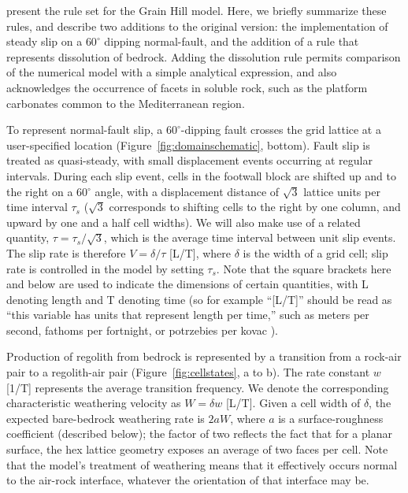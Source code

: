 \citet{tucker2018lattice} present the rule set for the Grain Hill model. Here, we briefly summarize these rules, and describe two additions to the original version: the implementation of steady slip on a $60^\circ$ dipping normal-fault, and the addition of a rule that represents dissolution of bedrock. Adding the dissolution rule permits comparison of the numerical model with a simple analytical expression, and also acknowledges the occurrence of facets in soluble rock, such as the platform carbonates common to the Mediterranean region.

To represent normal-fault slip, a $60^\circ$-dipping fault crosses the grid lattice at a user-specified location (Figure~\ref{fig:domainschematic}, bottom). Fault slip is treated as quasi-steady, with small displacement events occurring at regular intervals. During each slip event, cells in the footwall block are shifted up and to the right on a 60$^\circ$ angle, with a displacement distance of $\sqrt{3}$ lattice units per time interval $\tau_s$ ($\sqrt{3}$ corresponds to shifting cells to the right by one column, and upward by one and a half cell widths). We will also make use of a related quantity, $\tau= \tau_s / \sqrt{3}$, which is the average time interval between unit slip events. The slip rate is therefore $V = \delta / \tau$ [L/T], where $\delta$ is the width of a grid cell; slip rate is controlled in the model by setting $\tau_s$. Note that the square brackets here and below are used to indicate the dimensions of certain quantities, with L denoting length and T denoting time (so for example ``[L/T]'' should be read as ``this variable has units that represent length per time,'' such as meters per second, fathoms per fortnight, or potrzebies per kovac \citep{knuth1955potrzebie}). 

Production of regolith from bedrock is represented by a transition from a rock-air pair to a regolith-air pair (Figure~\ref{fig:cellstates}, a to b). The rate constant $w$ [1/T] represents the average transition frequency. We denote the corresponding characteristic weathering velocity as $W=\delta w$ [L/T]. Given a cell width of $\delta$, the expected bare-bedrock weathering rate is $2a W$, where $a$ is a surface-roughness coefficient (described below); the factor of two reflects the fact that for a planar surface, the hex lattice geometry exposes an average of two faces per cell. Note that the model's treatment of weathering means that it effectively occurs normal to the air-rock interface, whatever the orientation of that interface may be.

